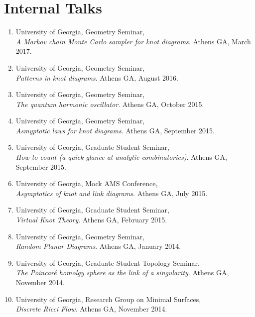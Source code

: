 \documentclass[letterpaper]{article}
\begin{document}
\section*{Internal Talks}

\begin{enumerate}

\item University of Georgia, Geometry Seminar, \\
  \textit{A Markov chain Monte Carlo sampler for knot diagrams}. Athens GA,
  March 2017.
  
\item University of Georgia, Geometry Seminar, \\
  \textit{Patterns in knot diagrams}. Athens GA, August 2016. 

\item University of Georgia, Geometry Seminar,\\
  \textit{The quantum harmonic oscillator}. Athens GA, October 2015.
  
\item University of Georgia, Geometry Seminar, \\
  \textit{Asmyptotic laws for knot diagrams}. Athens GA, September 2015.
  
\item University of Georgia, Graduate Student Seminar, \\
  \textit{How to count (a quick glance at analytic combinatorics)}. Athens GA, September 2015.
  
\item University of Georgia, Mock AMS Conference, \\
  \textit{Asymptotics of knot and link diagrams}. Athens GA, July 2015.

\item University of Georgia, Graduate Student Seminar,\\
  \textit{Virtual Knot Theory}. Athens GA, February 2015.
  
\item University of Georgia, Geometry Seminar,\\
  \textit{Random Planar Diagrams}. Athens GA, January 2014.
  
\item University of Georgia, Graduate Student Topology Seminar,\\
  \textit{The Poincar\'e homolgy sphere as the link of a singularity}. Athens GA, November 2014.
  
\item University of Georgia, Research Group on Minimal Surfaces, \\
  \textit{Discrete Ricci Flow}. Athens GA, November 2014.
  

\end{enumerate}
\end{document}
